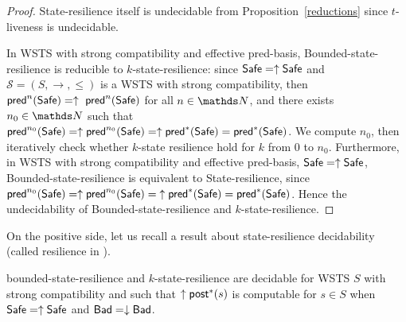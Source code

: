 \begin{proof}
{\sc State-resilience} itself is undecidable from Proposition~\ref{reductions} since $t$-liveness is undecidable.


In WSTS with strong compatibility and effective pred-basis, {\sc Bounded-state-resilience} is
reducible to {\sc $k$-state-resilience}:
% 
since $\Safe=\uparrow \Safe$ and
$\mathscr{S}=(S,\rightarrow,\leq)$ is a WSTS with strong %
compatibility, then $\textsf{pred}^n(\textsf{Safe})= \uparrow~\textsf{pred}^n(\textsf{Safe})$ for all $n \in \N$,
and there exists $n_0 \in \N$ such that 
$\textsf{pred}^{n_0}(\textsf{Safe}) = \uparrow \textsf{pred}^{n_0}(\textsf{Safe}) = \uparrow \textsf{pred}^*(\textsf{Safe}) = \textsf{pred}^*(\textsf{Safe})$.
We compute 
$n_0$, then iteratively check whether $k$-state resilience hold for $k$ from $0$ to $n_0$.  
Furthermore, in WSTS with strong compatibility and effective pred-basis,  $\Safe=\uparrow \Safe$, {\sc Bounded-state-resilience} is equivalent to {\sc State-resilience},
%
since 
$\textsf{pred}^{n_0}(\textsf{Safe}) = \uparrow \textsf{pred}^{n_0}(\textsf{Safe}) = {\uparrow \textsf{pred}^*(\textsf{Safe})} = \textsf{pred}^*(\textsf{Safe})$.
Hence the %
 undecidability of {\sc Bounded-state-resilience}
and 
 {\sc $k$-state-resilience}.


\iffalse
Bounded state-resilience and 
$k$ state-resilience are undecidable for strongly compatible WSTS with effective pred-basis
when
$\Safe=\uparrow \Safe$
and $\Bad=\downarrow \Bad$.
\fi

\end{proof}






On the positive side, let us recall a result about state-resilience decidability (called resilience in \cite{DBLP:conf/gg/Ozkan22,DBLP:journals/corr/abs-2108-00889}).

\begin{theorem}\cite{DBLP:conf/gg/Ozkan22,DBLP:journals/corr/abs-2108-00889}\label{ref ozkan}
{\sc bounded-state-resilience} and {\sc $k$-state-resilience} are decidable for WSTS $S$ with strong compatibility and such that $\uparrow \textsf{post}^*(s)$ is computable for $s \in S$
when
$\Safe=\uparrow \Safe$
and $\Bad=\downarrow \Bad$.
\end{theorem}

